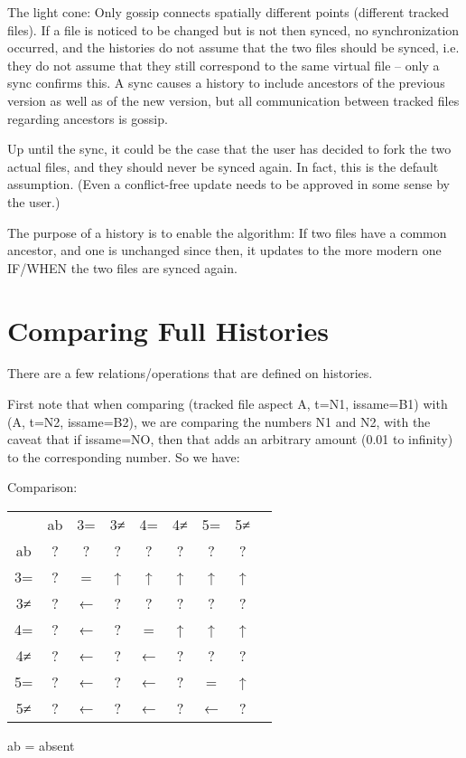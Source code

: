 \documentclass{book}
\begin{document}
The light cone:  Only gossip connects spatially different points (different tracked files).  If a file is noticed to be changed but is not then synced, no synchronization occurred, and the histories do not assume that the two files should be synced, i.e. they do not assume that they still correspond to the same virtual file -- only a sync confirms this.  A sync causes a history to include ancestors of the previous version as well as of the new version, but all communication between tracked files regarding ancestors is gossip.

Up until the sync, it could be the case that the user has decided to fork the two actual files, and they should never be synced again.  In fact, this is the default assumption.  (Even a conflict-free update needs to be approved in some sense by the user.)

The purpose of a history is to enable the algorithm:  If two files have a common ancestor, and one is unchanged since then, it updates to the more modern one IF/WHEN the two files are synced again.


\section{Comparing Full Histories}

There are a few relations/operations that are defined on histories.

First note that when comparing (tracked file aspect A, t=N1, issame=B1) with (A, t=N2, issame=B2), we are comparing the numbers N1 and N2, with the caveat that if issame=NO, then that adds an arbitrary amount (0.01 to infinity) to the corresponding number.  So we have:

Comparison:
\begin{tabular}{ccccccccc}
        & ab  & 3=  & 3≠  & 4=  & 4≠  & 5=  & 5≠  \\
    ab  &  ?  &  ?  &  ?  &  ?  &  ?  &  ?  &  ?  \\
    3=  &  ?  &  =  &  ↑  &  ↑  &  ↑  &  ↑  &  ↑  \\
    3≠  &  ?  &  ←  &  ?  &  ?  &  ?  &  ?  &  ?  \\
    4=  &  ?  &  ←  &  ?  &  =  &  ↑  &  ↑  &  ↑  \\
    4≠  &  ?  &  ←  &  ?  &  ←  &  ?  &  ?  &  ?  \\
    5=  &  ?  &  ←  &  ?  &  ←  &  ?  &  =  &  ↑  \\
    5≠  &  ?  &  ←  &  ?  &  ←  &  ?  &  ←  &  ?  \\
\end{tabular}
     ab = absent
\end{document}
